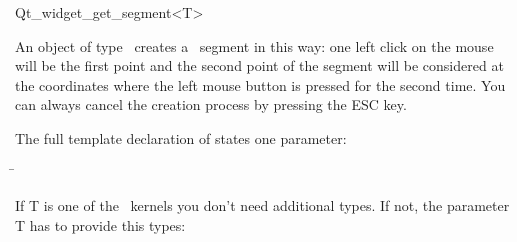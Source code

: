
\begin{ccRefClass}{Qt_widget_get_segment<T>}

\ccDefinition
An object of type \ccRefName\ creates a \cgal\ segment in this 
way: one left click on the mouse will be the first point and the second point 
of the segment will be considered at the coordinates where the left
mouse button is pressed for the second time.
You can always cancel the creation process by pressing the ESC key.


\ccParameters

The full template declaration of  states one parameter:

\begin{tabbing}
 \=\\
\end{tabbing}

If T is one of the \cgal\ kernels you don't need additional types. If
not, the parameter T has to provide this types:

\ccTypes
{}

\ccInheritsFrom
{}

\ccGlue

\ccCreation
{}


\end{ccRefClass}








